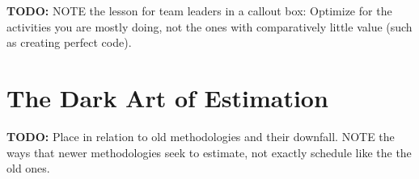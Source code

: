 \vspace{20pt}
\setlength{\fboxsep}{10pt}%

\textbf{TODO:} NOTE the lesson for team leaders in a callout box: Optimize for the activities you are mostly doing, not the ones with comparatively little value (such as creating perfect code).

\section{The Dark Art of Estimation}

\textbf{TODO:} Place in relation to old methodologies and their downfall. NOTE the ways that newer methodologies seek to estimate, not exactly schedule like the the old ones.



\newpage
\thispagestyle{empty}
